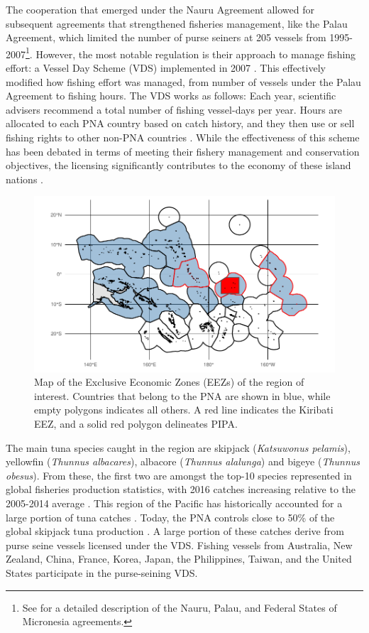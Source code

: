 \documentclass[9pttwoside,lineno]{pnas-new}
\begin{document}
The cooperation that emerged under the Nauru Agreement allowed for subsequent
agreements that strengthened fisheries management, like the Palau
Agreement, which limited the number of purse seiners at 205 vessels from
1995-2007\footnote{See \citet{havice_2010} for a detailed description of
  the Nauru, Palau, and Federal States of Micronesia agreements.}. However, the most notable regulation is
their approach to manage fishing effort: a Vessel Day Scheme (VDS)
implemented in 2007 \citep{havice_2013}. This effectively modified how
fishing effort was managed, from number of vessels under the Palau
Agreement to fishing hours. The VDS works as follows: Each year,
scientific advisers recommend a total number of fishing vessel-days per
year. Hours are allocated to each PNA country based on catch history,
and they then use or sell fishing rights to other non-PNA countries
\citep{aqorau_2018}. While the effectiveness of this scheme has been
debated in terms of meeting their fishery management and conservation
objectives, the licensing significantly contributes to the economy of
these island nations \citep{havice_2010}.

\begin{figure}
\centering
\includegraphics{img/PNA_map.pdf}
\caption{\label{fig:PNA_map}Map of the Exclusive
Economic Zones (EEZs) of the region of interest. Countries that belong
to the PNA are shown in blue, while empty polygons indicates all others.
A red line indicates the Kiribati EEZ, and a solid red polygon
delineates PIPA.}
\end{figure}

The main tuna species caught in the region are skipjack
(\emph{Katsuwonus pelamis}), yellowfin (\emph{Thunnus albacares}),
albacore (\emph{Thunnus alalunga}) and bigeye (\emph{Thunnus obesus}).
From these, the first two are amongst the top-10 species represented in
global fisheries production statistics, with 2016 catches increasing
relative to the 2005-2014 average \citep{fao_2018}. This region of the
Pacific has historically accounted for a large portion of tuna catches
\citep{aqorau_1997}. Today, the PNA controls close to 50\% of the global
skipjack tuna production \citep{pna_website_2018}. A large portion of
these catches derive from purse seine vessels licensed under the VDS.
Fishing vessels from Australia, New Zealand, China, France, Korea,
Japan, the Philippines, Taiwan, and the United States participate in the
purse-seining VDS.
\end{document}

